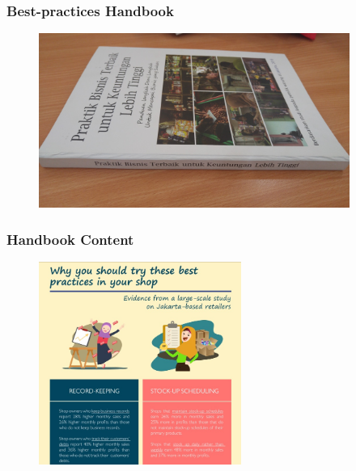 \documentclass[hideothersubsections, usenames,dvipsnames,11pt]{beamer}
\begin{document}
\begin{frame}
\frametitle{Best-practices Handbook}

\begin{figure}[htbp]
	\centering
		\includegraphics[width=4in]{pics/handbook.jpg}
	
	\label{height}
\end{figure}
\end{frame}


\begin{frame}
\frametitle{Handbook Content}
\begin{figure}[htbp]
	\centering
		\includegraphics[width=2.6in]{pics/Handbook_return.jpg}
	
	\label{height}
\end{figure}
\end{frame}



	
\end{document}
